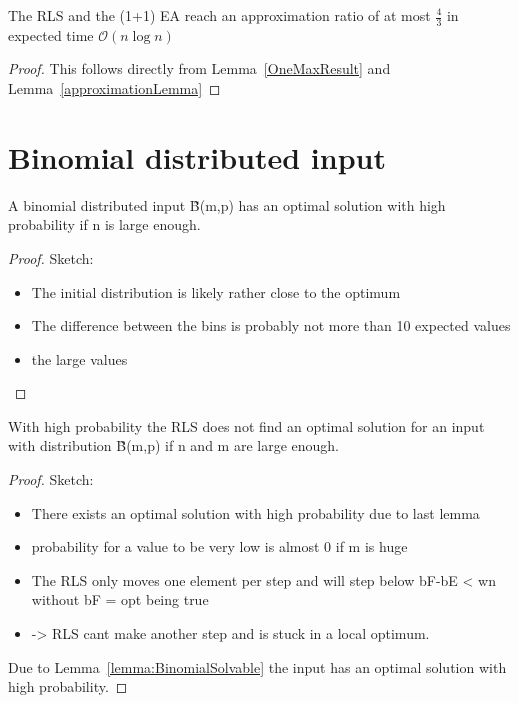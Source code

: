 \begin{corollary}
    The RLS and the (1+1) EA reach an approximation ratio of at most $\frac{4}{3}$ in expected time $\mathcal{O}(n\log{}n)$
\end{corollary}
\begin{proof}
    This follows directly from Lemma~\ref{OneMaxResult} and Lemma~\ref{approximationLemma}
\end{proof}

\section{Binomial distributed input}
\begin{lemma}\label{lemma:BinomialSolvable}
    A binomial distributed input \~B(m,p) has an optimal solution with high probability if n is large enough.
\end{lemma}
\begin{proof}
    Sketch:
    \begin{itemize}
        \item The initial distribution is likely rather close to the optimum
        \item The difference between the bins is probably not more than 10 expected values
        \item the large values  
    \end{itemize}
\end{proof}


\begin{lemma}
    With high probability the RLS does not find an optimal solution for an input with distribution \~B(m,p) if n and m are large enough.
\end{lemma}
\begin{proof}
    Sketch:
    \begin{itemize}
        \item There exists an optimal solution with high probability due to last lemma
        \item probability for a value to be very low is almost 0 if m is huge
        \item The RLS only moves one element per step and will step below bF-bE < wn without bF = opt being true
        \item -> RLS cant make another step and is stuck in a local optimum.
    \end{itemize}
    Due to Lemma~\ref{lemma:BinomialSolvable} the input has an optimal solution with high probability.
\end{proof}